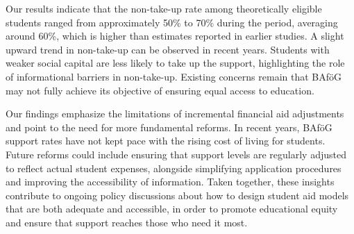 Our results indicate that the non-take-up rate among theoretically eligible students ranged from approximately 50\% to 70\% during the period, averaging around 60\%, which is higher than estimates reported in earlier studies. A slight upward trend in non-take-up can be observed in recent years. 
Students with weaker social capital are less likely to take up the support, highlighting the role of informational barriers in non-take-up. 
Existing concerns remain that BAföG may not fully achieve its objective of ensuring equal access to education.


Our findings emphasize the limitations of incremental financial aid adjustments and point to the need for more fundamental reforms. In recent years, BAföG support rates have not kept pace with the rising cost of living for students. Future reforms could include ensuring that support levels are regularly adjusted to reflect actual student expenses, alongside simplifying application procedures and improving the accessibility of information. Taken together, these insights contribute to ongoing policy discussions about how to design student aid models that are both adequate and accessible, in order to promote educational equity and ensure that support reaches those who need it most.

